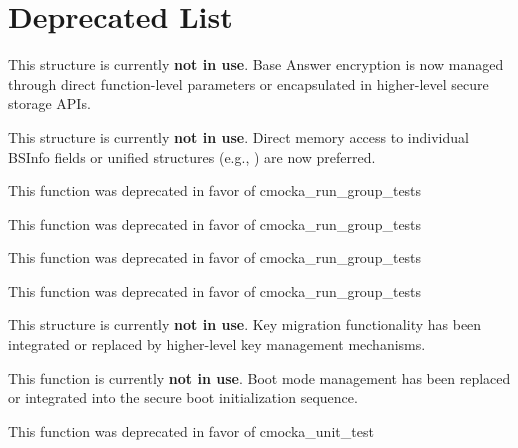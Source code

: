 \chapter{Deprecated List}
\hypertarget{deprecated}{}\label{deprecated}

\begin{DoxyRefList}
\item[Struct \doxylink{structbaseansr__t}{baseansr\+\_\+t} ]\label{deprecated__deprecated000015}%
%
 This structure is currently {\bfseries{not in use}}. Base Answer encryption is now managed through direct function-\/level parameters or encapsulated in higher-\/level secure storage APIs. 
\item[Struct \doxylink{structfsbl__bsinfo__ptr__t}{fsbl\+\_\+bsinfo\+\_\+ptr\+\_\+t} ]\label{deprecated__deprecated000013}%
%
 This structure is currently {\bfseries{not in use}}. Direct memory access to individual BSInfo fields or unified structures (e.\+g., ) are now preferred. 
\item[Global \doxylink{group__cmocka__exec_ga246dbcbb338e4becbfef009b2bb14b78}{group\+\_\+test\+\_\+setup} (setup)]\label{deprecated__deprecated000004}%
%
This function was deprecated in favor of cmocka\+\_\+run\+\_\+group\+\_\+tests 

\label{deprecated__deprecated000010}%
%
This function was deprecated in favor of cmocka\+\_\+run\+\_\+group\+\_\+tests  
\item[Global \doxylink{group__cmocka__exec_ga03159d4169e85cb92bb0eba97cfcf18d}{group\+\_\+test\+\_\+teardown} (teardown)]\label{deprecated__deprecated000005}%
%
This function was deprecated in favor of cmocka\+\_\+run\+\_\+group\+\_\+tests 

\label{deprecated__deprecated000011}%
%
This function was deprecated in favor of cmocka\+\_\+run\+\_\+group\+\_\+tests  
\item[Struct \doxylink{structmig__key__t}{mig\+\_\+key\+\_\+t} ]\label{deprecated__deprecated000014}%
%
 This structure is currently {\bfseries{not in use}}. Key migration functionality has been integrated or replaced by higher-\/level key management mechanisms. 
\item[Global \doxylink{SSBL_2SBC__FileCtrl_8c_a628ab578804897888390b1e69b1f34ba}{SBC\+\_\+\+Read\+Boot\+Mode} (VOID)]\label{deprecated__deprecated000016}%
%
 This function is currently {\bfseries{not in use}}. Boot mode management has been replaced or integrated into the secure boot initialization sequence. 
\item[Global \doxylink{group__cmocka__exec_gaf79fe61343efe7cdeb5bbb12a5577cb3}{unit\+\_\+test} (f)]\label{deprecated__deprecated000001}%
%
This function was deprecated in favor of cmocka\+\_\+unit\+\_\+test 


\end{DoxyRefList}
